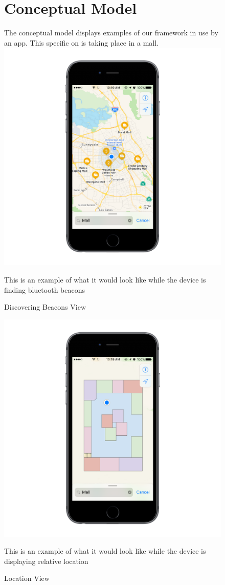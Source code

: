 \begin{figure}
\chapter{Conceptual Model}
The conceptual model displays examples of our framework in use by an app. This specific on is taking place in a mall.
\newline
\includegraphics[width=1\textwidth]{images/con1.png}
\caption{Discovering Beacons View}
This is an example of what it would look like while the device is finding bluetooth beacons
\end{figure}
\begin{figure}
\includegraphics[width=1\textwidth]{images/con2.png}
\caption{Location View}
This is an example of what it would look like while the device is displaying relative location
\end{figure}
